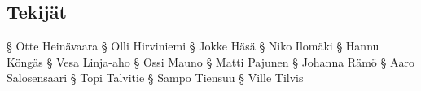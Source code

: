 \subsection*{Tekijät} %
\tekijat
§ Otte Heinävaara
§ Olli Hirviniemi
§ Jokke Häsä
§ Niko Ilomäki
§ Hannu Köngäs
§ Vesa Linja-aho
§ Ossi Mauno
§ Matti Pajunen
§ Johanna Rämö
§ Aaro Salosensaari
§ Topi Talvitie
§ Sampo Tiensuu
§ Ville Tilvis
\loppu
